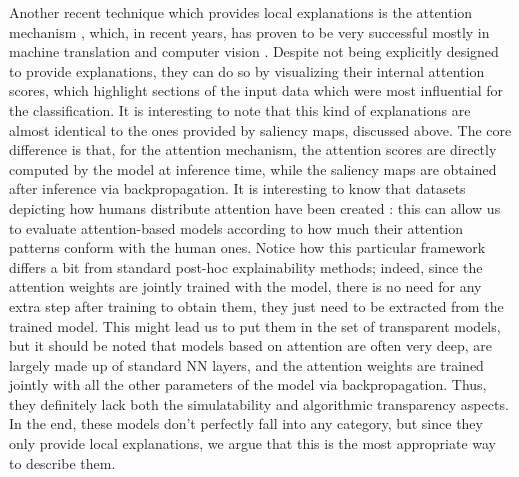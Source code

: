Another recent technique which provides local explanations is the attention mechanism \cite{attentionisall2017vaswani}, which, in recent years, has proven to be very successful mostly in machine translation \cite{devlin2018bert} and computer vision \cite{dosovitskiy2020image}.
Despite not being explicitly designed to provide explanations, they can do so by visualizing their internal attention scores, which highlight sections of the input data which were most influential for the classification. It is interesting to note that this kind of explanations are almost identical to the ones provided by saliency maps, discussed above. The core difference is that, for the attention mechanism, the attention scores are directly computed by the model at inference time, while the saliency maps are obtained after inference via backpropagation.
It is interesting to know that datasets depicting how humans distribute attention have been created \cite{park2018multimodal,das2017human}: this can allow us to evaluate attention-based models according to how much their attention patterns conform with the human ones.
Notice how this particular framework differs a bit from standard post-hoc explainability methods; indeed, since the attention weights are jointly trained with the model, there is no need for any extra step after training to obtain them, they just need to be extracted from the trained model. This might lead us to put them in the set of transparent models, but it should be noted that models based on attention are often very deep, are largely made up of standard NN layers, and the attention weights are trained jointly with all the other parameters of the model via backpropagation. Thus, they definitely lack both the simulatability and algorithmic transparency aspects. In the end, these models don't perfectly fall into any category, but since they only provide local explanations, we argue that this is the most appropriate way to describe them.

